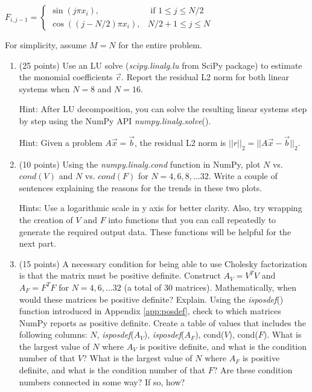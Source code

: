 \documentclass[10pt]{article}
\begin{document}
\begin{center}
$F_{i, j-1}=\left\{
    \begin{array}{ll}
        \sin \left(j \pi x_{i}\right), & \text { if } 1 \leq j \leq N / 2 \\
        \cos \left((j-N / 2) \pi x_{i}\right), & N / 2+1 \leq j \leq N
    \end{array}
\right.$
\end{center}

For simplicity, assume $M=N$ for the entire problem.

\begin{enumerate}[label=3.\arabic*]
    \item (25 points) \label{q:3.1}
    Use an LU solve (\textit{scipy.linalg.lu} from SciPy package) to estimate the monomial coefficients $\vec{c}$. 
    Report the residual L2 norm for both linear systems when $N = 8$ and $N = 16$. 
    
    Hint: After LU decomposition, you can solve the resulting linear systems step by step using the NumPy API \textit{numpy.linalg.solve}().
    
    Hint: Given a problem $A\vec{x}=\vec{b}$, the residual L2 norm is $||r||_2=||A\vec{x}-\vec{b}||_2$.
    
    \item (10 points)
    Using the \textit{numpy.linalg.cond} function in NumPy, plot $N$ vs. $cond(V)$ and $N$ vs. $cond(F)$ for $N = 4, 6, 8, ...32$. 
    Write a couple of sentences explaining the reasons for the trends in these two plots. 
    
    Hints: Use a logarithmic scale in y axis for better clarity. Also, try wrapping the creation of $V$ and $F$ into functions that you can call repeatedly to generate the required output data. These functions will be helpful for the next part.
    
    \item (15 points) \label{q:3.3}
    A necessary condition for being able to use Cholesky factorization is that the matrix must be positive definite. 
    Construct $A_V = V^TV$ and $A_F = F^TF$ for $N = 4, 6, \dots32$ (a total of 30 matrices). 
    Mathematically, when would these matrices be positive definite? Explain.
    Using the \textit{isposdef}() function introduced in Appendix \ref{app:posdef}, check to which matrices NumPy reports as positive definite. Create a table of values that includes the following columns: $N$, \textit{isposdef}($A_V$), \textit{isposdef}($A_F$), cond($V$), cond($F$).
    What is the largest value of $N$ where $A_V$ is positive definite, and what is the condition number of that $V$? 
    What is the largest value of $N$ where $A_F$ is positive definite, and what is the condition number of that $F$? 
    Are these condition numbers connected in some way? If so, how?
    

\end{enumerate}
\end{document}
